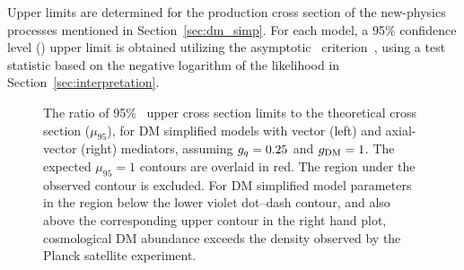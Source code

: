 Upper limits are determined for the production cross section of the new-physics processes mentioned in Section~\ref{sec:dm_simp}. 
For each model, a 95\% confidence level (\CL) upper limit is obtained utilizing the asymptotic \CLs\ criterion~\cite{Junk:1999kv,Read:2002hq,Cowan:2010js}, using a test statistic based on the negative logarithm of the likelihood in Section~\ref{sec:interpretation}.

\begin{figure}[htbp]
  \centering
  \caption{
    The ratio of 95\% \CL\ upper cross section limits to the theoretical cross section ($\mu_{95}$), for DM simplified models with vector (left) and axial-vector (right) mediators, assuming $g_{{q}}=0.25$ and $g_{\text{DM}}=1$.
    The expected $\mu_{95} = 1$ contours are overlaid in red. 
    The region under the observed contour is excluded.
    For DM simplified model parameters in the region below the lower violet dot--dash contour, and also above the corresponding upper contour in the right hand plot, cosmological DM abundance exceeds the density observed by the Planck satellite experiment.
  }
  \label{fig:limits}
\end{figure}

